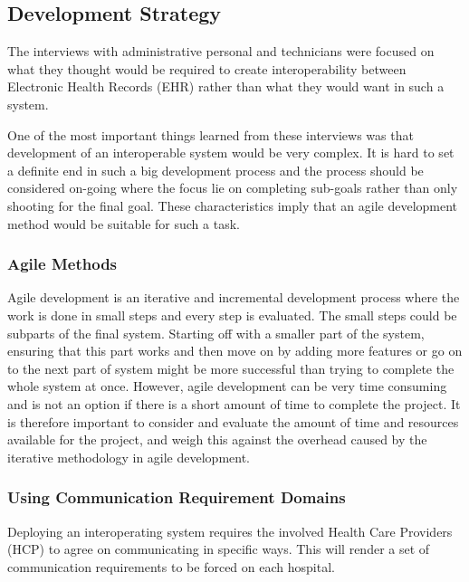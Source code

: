 \documentclass[14pt]{article}
\begin{document}
\subsection{Development Strategy}
The interviews with administrative personal and technicians were focused on what they thought would be required to create interoperability between Electronic Health Records (EHR) rather than what they would want in such a system. 

One of the most important things learned from these interviews was that development of an interoperable system would be very complex. It is hard to set a definite end in such a big development process and the process should be considered on-going where the focus lie on completing sub-goals rather than only shooting for the final goal. These characteristics imply that an agile development method would be suitable for such a task.

\subsubsection{Agile Methods} %
Agile development is an iterative and incremental development process where the work is done in small steps and every step is evaluated. The small steps could be subparts of the final system. Starting off with a smaller part of the system, ensuring that this part works and then move on by adding more features or go on to the next part of system might be more successful than trying to complete the whole system at once. However, agile development can be very time consuming and is not an option if there is a short amount of time to complete the project. It is therefore important to consider and evaluate the amount of time and resources available for the project, and weigh this against the overhead caused by the iterative methodology in agile development.

\subsubsection{Using Communication Requirement Domains} %
Deploying an interoperating system requires the involved Health Care Providers (HCP) to agree on communicating in specific ways. This will render a set of communication requirements to be forced on each hospital. 
\end{document}
